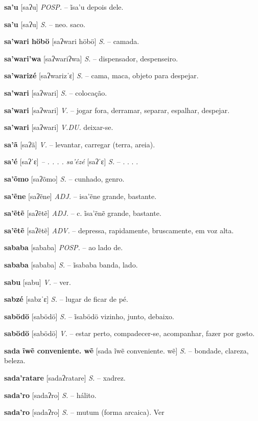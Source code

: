 \textbf{sa'u} [saʔu] \textit{POSP.} -- ĩsa'u depois dele.

\textbf{sa'u} [saʔu] \textit{S.} -- neo. saco.

\textbf{sa'wari höbö} [saʔwari höbö] \textit{S.} -- camada.

\textbf{sa'wari'wa} [saʔwariʔwa] \textit{S.} -- dispensador, despenseiro.

\textbf{sa'warizé} [saʔwarizˈɛ] \textit{S.} -- cama, maca, objeto para despejar.

\textbf{sa'wari} [saʔwari] \textit{S.} -- colocação.

\textbf{sa'wari} [saʔwari] \textit{V.} -- jogar fora, derramar, separar, espalhar, despejar.

\textbf{sa'wari} [saʔwari] \textit{V.DU.} deixar-se.

\textbf{sa'ã} [saʔã] \textit{V.} -- levantar, carregar (terra, areia).

\textbf{sa'é} [saʔˈɛ] \textit{-- . . . . sa'ézé} [saʔˈɛ] \textit{S.} -- . . . .

\textbf{sa'õmo} [saʔõmo] \textit{S.} -- cunhado, genro.

\textbf{sa'ẽne} [saʔẽne] \textit{ADJ.} -- isa'ẽne grande, bastante.

\textbf{sa'ẽtẽ} [saʔẽtẽ] \textit{ADJ.} -- c. ĩsa'ẽnẽ grande, bastante.

\textbf{sa'ẽtẽ} [saʔẽtẽ] \textit{ADV.} -- depressa, rapidamente, bruscamente, em voz alta.

\textbf{sababa} [sababa] \textit{POSP.} -- ao lado de.

\textbf{sababa} [sababa] \textit{S.} -- ĩsababa banda, lado.

\textbf{sabu} [sabu] \textit{V.} -- ver.

\textbf{sabzé} [sabzˈɛ] \textit{S.} -- lugar de ficar de pé.

\textbf{sabödö} [sabödö] \textit{S.} -- ĩsabödö vizinho, junto, debaixo.

\textbf{sabödö} [sabödö] \textit{V.} -- estar perto, compadecer-se, acompanhar, fazer por gosto.

\textbf{sada ĩwẽ conveniente. wẽ} [sada ĩwẽ conveniente. wẽ] \textit{S.} -- bondade, clareza, beleza.

\textbf{sada'ratare} [sadaʔratare] \textit{S.} -- xadrez.

\textbf{sada'ro} [sadaʔro] \textit{S.} -- hálito.

\textbf{sada'ro} [sadaʔro] \textit{S.} -- mutum (forma arcaica). Ver

